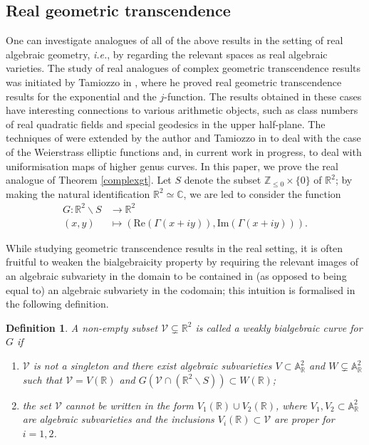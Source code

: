 \documentclass[11pt,reqno]{amsart}
\newtheorem{definition}[theorem]{Definition}
\theoremstyle{definition}
\numberwithin{equation}{section}
\newcommand{\R}{\mathbb{R}}
\renewcommand{\Im}{\mathrm{Im}}
\renewcommand{\Re}{\mathrm{Re}}
\newcommand{\cV}{\mathcal{V}}
\begin{document}
\subsection{Real geometric transcendence} 
One can investigate  analogues of all of the above results in the setting of real algebraic geometry, \textit{i.e.}, by regarding the relevant spaces as real algebraic varieties. The study of real analogues of complex geometric transcendence results was initiated by Tamiozzo in \cite{Tam23}, where he proved real geometric transcendence results for the exponential and the $j$-function. The results obtained in these cases have interesting connections to various arithmetic objects, such as class numbers of real quadratic fields and special geodesics in the upper half-plane.  The techniques of \cite{Tam23} were extended by the author and Tamiozzo in \cite{ST25} to deal with the case of the Weierstrass elliptic functions and, in current work in progress, to deal with  uniformisation maps of higher genus curves.  In this paper, we prove the real analogue of Theorem \ref{complexgt}.  Let $S$ denote the subset $\mathbb Z_{\leq 0} \times \{0\}$ of $\R^2$;  by making the natural identification $\mathbb R^2 \simeq \mathbb C$, we are led to consider the function
\begin{align*}
    G : \mathbb R^2  \smallsetminus S  & \rightarrow \R^2\\
    (x, y) & \mapsto (\Re (\Gamma(x+iy)), \Im (\Gamma(x+iy))).
\end{align*}

While studying geometric transcendence results in the real setting, it is often fruitful to weaken the bialgebraicity property by requiring the relevant images of an algebraic subvariety in the domain to be contained in (as opposed to being equal to) an algebraic subvariety in the codomain; this intuition is formalised in the following definition. 

\begin{definition}\label{bialgd}
A non-empty subset $\cV \subsetneq \mathbb R^2$ is called a weakly bialgebraic curve for $G$ if %
\begin{enumerate}
\item $\cV$ is not a singleton and there exist algebraic subvarieties $V \subset \mathbb A^2_\mathbb R$ and $W \subsetneq \mathbb A^2_\mathbb R$ such that $\cV=V(\mathbb R)$ and  $G(\cV \cap (  \mathbb R^2  \smallsetminus S)) \subset W(\mathbb R)$;
\item the set $\cV$ cannot be written in the form $V_1(\mathbb R) \cup V_2(\mathbb R)$, where $V_1, V_2 \subset \mathbb A^2_\mathbb R$ are algebraic subvarieties and the inclusions $V_i(\mathbb R)\subset \cV$ are proper for $i=1, 2$. 
\end{enumerate}
\end{definition}
\end{document}
